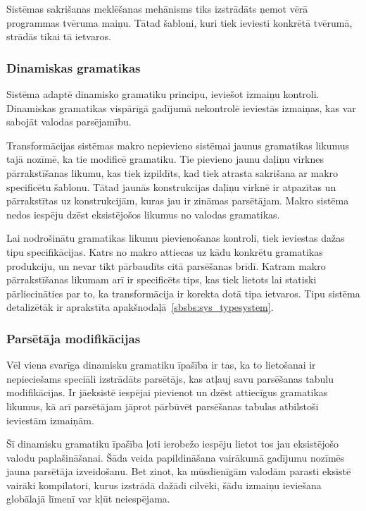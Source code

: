 Sistēmas sakrišanas meklēšanas mehānisms tiks izstrādāts ņemot vērā programmas tvēruma maiņu. Tātad šabloni, kuri tiek ieviesti konkrētā tvērumā, strādās tikai tā ietvaros.

\subsubsection{\label{sbsbs:sys_dynamicgrammars}Dinamiskas gramatikas}

Sistēma adaptē dinamisko gramatiku principu, ieviešot izmaiņu kontroli. Dinamiskas gramatikas vispārīgā gadījumā nekontrolē ieviestās izmaiņas, kas var sabojāt valodas parsējamību.


Transformācijas sistēmas makro nepievieno sistēmai jaunus gramatikas likumus tajā nozīmē, ka tie modificē gramatiku. Tie pievieno jaunu daļiņu virknes pārrakstīšanas likumu, kas tiek izpildīts, kad tiek atrasta sakrišana ar makro specificētu šablonu. Tātad jaunās konstrukcijas daļiņu virknē ir atpazītas un pārrakstītas uz konstrukcijām, kuras jau ir zināmas parsētājam. Makro sistēma nedos iespēju dzēst eksistējošos likumus no valodas gramatikas.

Lai nodrošinātu gramatikas likumu pievienošanas kontroli, tiek ieviestas dažas tipu specifikācijas. Katrs no makro attiecas uz kādu konkrētu gramatikas produkciju, un nevar tikt pārbaudīts citā parsēšanas brīdī. Katram makro pārrakstīšanas likumam arī ir specificēts tips, kas tiek lietots lai statiski pārliecināties par to, ka transformācija ir korekta dotā tipa ietvaros. Tipu sistēma detalizētāk ir aprakstīta apakšnodaļā~\ref{sbsbs:sys_typesystem}.

\subsubsection{\label{sbsbs:sys_parsermodifications}Parsētāja modifikācijas}

Vēl viena svarīga dinamisku gramatiku īpašība ir tas, ka to lietošanai ir nepieciešams speciāli izstrādāts parsētājs, kas atļauj savu parsēšanas tabulu modifikācijas. Ir jāeksistē iespējai pievienot un dzēst attiecīgus gramatikas likumus, kā arī parsētājam jāprot pārbūvēt parsēšanas tabulas atbilstoši ieviestām izmaiņām.

Šī dinamisku gramatiku īpašība ļoti ierobežo iespēju lietot tos jau eksistējošo valodu paplašināšanai. Šāda veida papildināšana vairākumā gadījumu nozīmēs jauna parsētāja izveidošanu. Bet zinot, ka mūsdienīgām valodām parasti eksistē vairāki kompilatori, kurus izstrādā dažādi cilvēki, šādu izmaiņu ieviešana globālajā līmenī var kļūt neiespējama.


